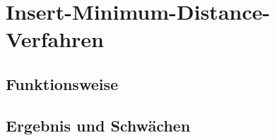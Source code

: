 \section{Insert-Minimum-Distance-Verfahren}
\subsection{Funktionsweise}
\subsection{Ergebnis und Schwächen}